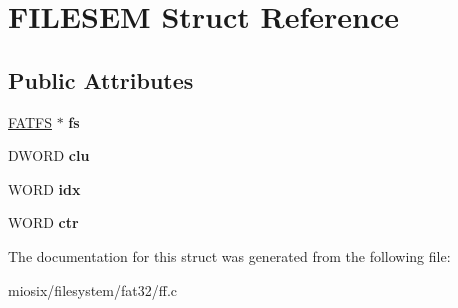 \hypertarget{struct_f_i_l_e_s_e_m}{\section{F\-I\-L\-E\-S\-E\-M Struct Reference}
\label{struct_f_i_l_e_s_e_m}
}
\subsection*{Public Attributes}
\begin{DoxyCompactItemize}
\item 
\hypertarget{struct_f_i_l_e_s_e_m_a0c6a1d2307c6f595a47ceaeaebc80255}{\hyperlink{struct_f_a_t_f_s}{F\-A\-T\-F\-S} $\ast$ {\bfseries fs}}\label{struct_f_i_l_e_s_e_m_a0c6a1d2307c6f595a47ceaeaebc80255}

\item 
\hypertarget{struct_f_i_l_e_s_e_m_a02edc835188d6af7c1b1bc52486a5d78}{D\-W\-O\-R\-D {\bfseries clu}}\label{struct_f_i_l_e_s_e_m_a02edc835188d6af7c1b1bc52486a5d78}

\item 
\hypertarget{struct_f_i_l_e_s_e_m_aab093ab4a57ecd03566077ff890e2577}{W\-O\-R\-D {\bfseries idx}}\label{struct_f_i_l_e_s_e_m_aab093ab4a57ecd03566077ff890e2577}

\item 
\hypertarget{struct_f_i_l_e_s_e_m_a2e5df477fb74015f09d62b0985871f1a}{W\-O\-R\-D {\bfseries ctr}}\label{struct_f_i_l_e_s_e_m_a2e5df477fb74015f09d62b0985871f1a}

\end{DoxyCompactItemize}


The documentation for this struct was generated from the following file\-:\begin{DoxyCompactItemize}
\item 
miosix/filesystem/fat32/ff.\-c\end{DoxyCompactItemize}
